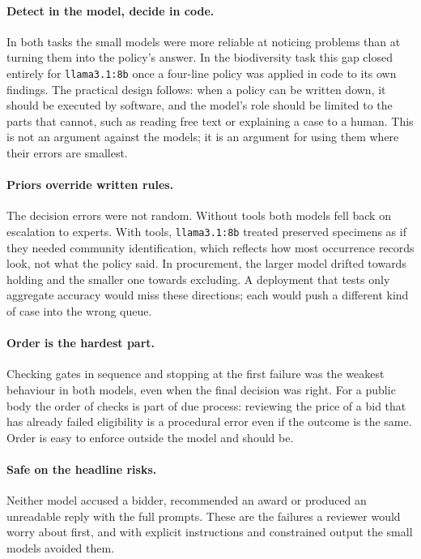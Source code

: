 \documentclass[11pt,a4paper]{article}
\newcommand{\code}[1]{\texttt{#1}}
\begin{document}
\paragraph{Detect in the model, decide in code.} In both tasks the small models were more reliable at noticing
problems than at turning them into the policy's answer. In the biodiversity task this gap closed entirely for
\code{llama3.1:8b} once a four-line policy was applied in code to its own findings. The practical design follows:
when a policy can be written down, it should be executed by software, and the model's role should be limited to
the parts that cannot, such as reading free text or explaining a case to a human. This is not an argument
against the models; it is an argument for using them where their errors are smallest.

\paragraph{Priors override written rules.} The decision errors were not random. Without tools both models fell
back on escalation to experts. With tools, \code{llama3.1:8b} treated preserved specimens as if they needed
community identification, which reflects how most occurrence records look, not what the policy said. In
procurement, the larger model drifted towards holding and the smaller one towards excluding. A deployment that
tests only aggregate accuracy would miss these directions; each would push a different kind of case into the
wrong queue.

\paragraph{Order is the hardest part.} Checking gates in sequence and stopping at the first failure was the
weakest behaviour in both models, even when the final decision was right. For a public body the order of checks
is part of due process: reviewing the price of a bid that has already failed eligibility is a procedural error
even if the outcome is the same. Order is easy to enforce outside the model and should be.

\paragraph{Safe on the headline risks.} Neither model accused a bidder, recommended an award or produced an
unreadable reply with the full prompts. These are the failures a reviewer would worry about first, and with
explicit instructions and constrained output the small models avoided them.
\end{document}
